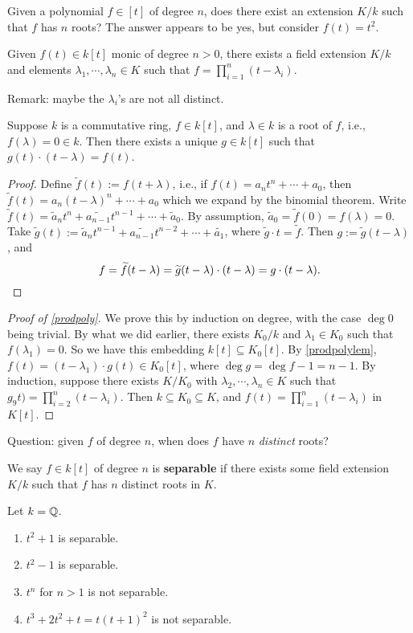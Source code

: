 Given a polynomial $f \in [t]$ of degree $n$, does there exist an extension $K / k $ such that $f$ has  $n$ roots? The answer appears to be yes, but consider $f(t)=t^2$.
\begin{prop}\label{prodpoly} 
    Given $f(t) \in k[t]$ monic of degree $n>0$, there exists a field extension $K /k$ and elements $\lambda_1 , \cdots ,\lambda_n \in K$ such that $f=\prod_{i=1}^n (t-\lambda_i )$. 
\end{prop}Remark: maybe the $\lambda _i $'s are not all distinct.
\begin{lemma}\label{prodpolylem} 
    Suppose $k$ is a commutative ring, $f \in k[t]$, and $\lambda \in k$ is a root of $f$, i.e., $f(\lambda)=0\in k$. Then there exists a unique $g \in k[t]$ such that $g(t) \cdot (t-\lambda)=f(t)$.
\end{lemma}
\begin{proof}
    Define $\widetilde f(t) := f(t+\lambda)$, i.e., if $f(t)=a_n  t ^n  + \cdots +a_0$, then $\widetilde f(t)= a_n (t-\lambda)^n  + \cdots +a_0$ which we expand by the binomial theorem. Write $\widetilde f(t)= \widetilde a _n  t ^n  + \widetilde{a_{n-1}}t ^{n-1}+ \cdots + \widetilde a_0 $. By assumption, $\widetilde a_0=\widetilde f(0)=f(\lambda)=0$. Take $\widetilde g(t):=\widetilde a _n  t ^{n-1}+ \widetilde {a _{n-1}} t ^{n-2}+ \cdots +\widetilde {a_1} $, where $\widetilde g \cdot t=\widetilde f$. Then $g := \widetilde g(t-\lambda)$, and \[
        f=\widetilde f(t-\lambda)=\widetilde g(t-\lambda) \cdot (t-\lambda)=g\cdot (t-\lambda).\qedhere
    \] 
\end{proof}
\begin{proof}[Proof of \cref{prodpoly}]
    We prove this by induction on degree, with the case $\deg 0$ being trivial. By what we did earlier, there exists $K_0 / k$ and $\lambda_1 \in K_0$ such that $f(\lambda_1)=0$. So we have this embedding $k[t] \subseteq  K_0[t]$. By \cref{prodpolylem}, $f(t)=(t-\lambda_1)\cdot g(t) \in K_0[t]$, where $\deg g = \deg f-1=n-1$. By induction, suppose there exists $K /K_0$ with $\lambda_2,\cdots ,\lambda_n  \in K$ such that $g_9t) = \prod _{i=2}^n  (t-\lambda_i )$. Then $k \subseteq  K_0 \subseteq K$, and $f(t)= \prod _{i=1}^n  (t-\lambda_i )$ in $K[t]$.
\end{proof}
Question: given $f$ of degree $n$, when does $f$ have $n$ \emph{distinct} roots?
\begin{definition}[]
    We say $f \in k[t]$ of degree $n$ is \textbf{separable} if there exists some field extension $K / k$ such that $f$ has $n$ distinct roots in $K$.
\end{definition}
\begin{example}
    Let $k=\mathbb{Q}$.
    \begin{enumerate}[label=(\arabic*)]
    \setlength\itemsep{-.2em}
        \item $t^2+1$ is separable.
        \item $t^2-1$ is separable.
        \item $t ^n $ for $n>1$ is not separable.
        \item $t^3+2 t^2+t=t(t+1)^2$ is not separable.
    \end{enumerate}
\end{example}
